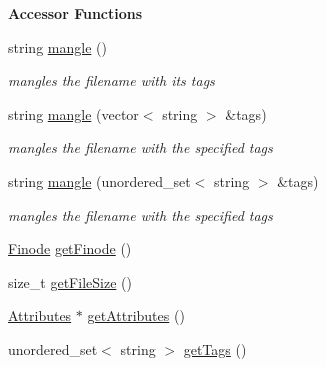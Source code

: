 \begin{Indent}\textbf{ Accessor Functions}\par
\begin{DoxyCompactItemize}
\item 
string \mbox{\hyperlink{classFileInfo_a96827c2e48fb1a15d468e9afd545383e}{mangle}} ()
\begin{DoxyCompactList}\small\item\em mangles the filename with its tags \end{DoxyCompactList}\item 
string \mbox{\hyperlink{classFileInfo_a105ad751f21bead6fc2a76e79cb3b701}{mangle}} (vector$<$ string $>$ \&tags)
\begin{DoxyCompactList}\small\item\em mangles the filename with the specified tags \end{DoxyCompactList}\item 
string \mbox{\hyperlink{classFileInfo_aec8a60addbed54097f6cac0a6a516717}{mangle}} (unordered\+\_\+set$<$ string $>$ \&tags)
\begin{DoxyCompactList}\small\item\em mangles the filename with the specified tags \end{DoxyCompactList}\item 
\mbox{\hyperlink{structfinode}{Finode}} \mbox{\hyperlink{classFileInfo_a80777be7ba01a63cca90c8d9062c49b3}{get\+Finode}} ()
\item 
size\+\_\+t \mbox{\hyperlink{classFileInfo_a7c33e236c627e7a4557207e9831342eb}{get\+File\+Size}} ()
\item 
\mbox{\hyperlink{classAttributes}{Attributes}} $\ast$ \mbox{\hyperlink{classFileInfo_abc9f651fdf3daf17e5526628b9edc272}{get\+Attributes}} ()
\item 
unordered\+\_\+set$<$ string $>$ \mbox{\hyperlink{classFileInfo_a0335ecd3301d3dd709de5e004567fd29}{get\+Tags}} ()
\end{DoxyCompactItemize}
\end{Indent}
